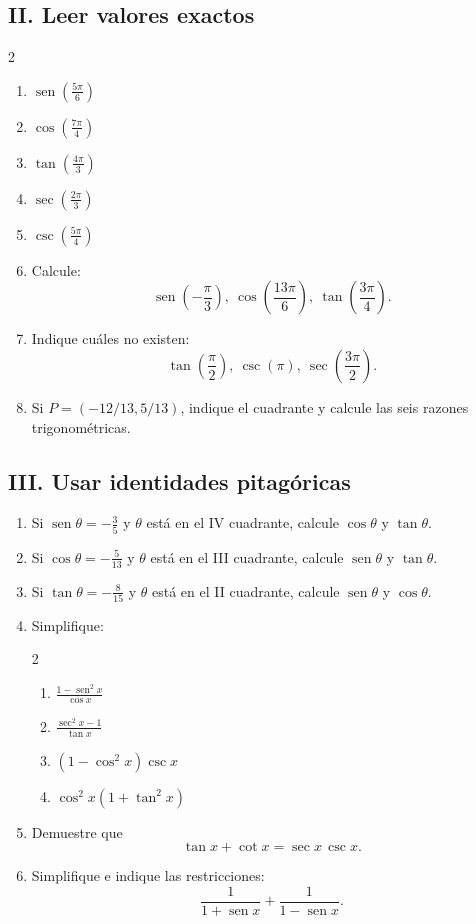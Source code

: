 \documentclass[letterpaper,12pt]{article}
\newcommand{\seno}{\operatorname{sen}}
\newcommand{\tituloSeccion}[1]{%
    \needspace{4\baselineskip}
    \subsection*{\color{azulFuerte}#1}
}
\begin{document}
\tituloSeccion{II. Leer valores exactos}
\begin{multicols}{2}
\begin{enumerate}[label=\color{azulFuerte}\textbf{\arabic*.},leftmargin=*,start=7]
    \item \(\seno\left(\frac{5\pi}{6}\right)\)
    \item \(\cos\left(\frac{7\pi}{4}\right)\)
    \item \(\tan\left(\frac{4\pi}{3}\right)\)
    \item \(\sec\left(\frac{2\pi}{3}\right)\)
    \item \(\csc\left(\frac{5\pi}{4}\right)\)
    \item Calcule:
    \[
    \seno\left(-\frac{\pi}{3}\right),\
    \cos\left(\frac{13\pi}{6}\right),\
    \tan\left(\frac{3\pi}{4}\right).
    \]
    \item Indique cuáles no existen:
    \[
    \tan\left(\frac{\pi}{2}\right),\
    \csc(\pi),\
    \sec\left(\frac{3\pi}{2}\right).
    \]
    \item Si \(P=(-12/13,5/13)\), indique el cuadrante y calcule las seis razones trigonométricas.
\end{enumerate}
\end{multicols}

\tituloSeccion{III. Usar identidades pitagóricas}
\begin{enumerate}[label=\color{azulFuerte}\textbf{\arabic*.},leftmargin=*,start=15]
    \item Si \(\seno\theta=-\frac35\) y \(\theta\) está en el IV cuadrante, calcule \(\cos\theta\) y \(\tan\theta\).
    \item Si \(\cos\theta=-\frac5{13}\) y \(\theta\) está en el III cuadrante, calcule \(\seno\theta\) y \(\tan\theta\).
    \item Si \(\tan\theta=-\frac8{15}\) y \(\theta\) está en el II cuadrante, calcule \(\seno\theta\) y \(\cos\theta\).
    \item Simplifique:
    \begin{multicols}{2}
    \begin{enumerate}[label=\alph*),leftmargin=*]
        \item \(\displaystyle\frac{1-\seno^2x}{\cos x}\)
        \item \(\displaystyle\frac{\sec^2x-1}{\tan x}\)
        \item \(\displaystyle(1-\cos^2x)\csc x\)
        \item \(\displaystyle\cos^2x(1+\tan^2x)\)
    \end{enumerate}
    \end{multicols}
    \item Demuestre que
    \[
        \tan x+\cot x=\sec x\,\csc x.
    \]
    \item Simplifique e indique las restricciones:
    \[
        \frac{1}{1+\seno x}+\frac{1}{1-\seno x}.
    \]
\end{enumerate}
\end{document}
